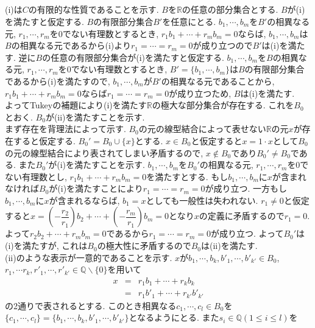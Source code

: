 \documentclass{jsarticle}
\begin{document}
\subsection{} %
(i)は$C$の有限的な性質であることを示す. $B$を$\mathbb{R}$の任意の部分集合とする. $B$が(i)を満たすと仮定する. $B$の有限部分集合$B'$を任意にとる. $b_1, \cdots, b_m$を$B'$の相異なる元, $r_1, \cdots, r_m$を0でない有理数とするとき, $r_1 b_1 + \cdots + r_m b_m = 0$ならば, $b_1, \cdots, b_m$は$B$の相異なる元であるから(i)より$r_1 = \cdots = r_m = 0$が成り立つので$B'$は(i)を満たす. 逆に$B$の任意の有限部分集合が(i)を満たすと仮定する. $b_1, \cdots, b_m$を$B$の相異なる元, $r_1, \cdots, r_m$を0でない有理数とするとき, $B' = \{b_1, \cdots, b_m\}$は$B$の有限部分集合であるから(i)を満たすので, $b_1, \cdots, b_m$が$B'$の相異なる元であることから, $r_1 b_1 + \cdots + r_m b_m = 0$ならば$r_1 = \cdots = r_m = 0$が成り立つため, $B$は(i)を満たす.\\
よってTukeyの補題により(i)を満たす$\mathbb{R}$の極大な部分集合が存在する. これを$B_0$とおく. $B_0$が(ii)を満たすことを示す.\\
まず存在を背理法によって示す. $B_0$の元の線型結合によって表せない$\mathbb{R}$の元$x$が存在すると仮定する. $B_0' = B_0 \cup \{x\}$とする. $x \in B_0$と仮定すると$x = 1 \cdot x$として$B_0$の元の線型結合により表されてしまい矛盾するので, $x \notin B_0$であり$B_0' \neq B_0$である. また$B_0'$が(i)を満たすことを示す. $b_1, \cdots, b_m$を$B_0'$の相異なる元, $r_1, \cdots, r_m$を0でない有理数とし, $r_1 b_1 + \cdots + r_m b_m = 0$を満たすとする. もし$b_1, \cdots, b_m$に$x$が含まれなければ$B_0$が(i)を満たすことにより$r_1 = \cdots = r_m = 0$が成り立つ. 一方もし$b_1, \cdots, b_m$に$x$が含まれるならば, $b_1 = x$としても一般性は失われない. $r_1 \neq 0$と仮定すると$x = \left(-\dfrac{r_2}{r_1}\right) b_2 + \cdots + \left(-\dfrac{r_m}{r_1}\right) b_m = 0$となり$x$の定義に矛盾するので$r_1 = 0$. よって$r_2 b_2 + \cdots + r_m b_m = 0$であるから$r_1 = \cdots = r_m = 0$が成り立つ. よって$B_0'$は(i)を満たすが, これは$B_0$の極大性に矛盾するので$B_0$は(ii)を満たす.\\
(ii)のような表示が一意的であることを示す. $x$が$b_1, \cdots, b_k, b'_1, \cdots, b'_{k'} \in B_0$, $r_1, \cdots r_k, r'_1, \cdots, r'_{k'} \in \mathbb{Q} \backslash \{0\}$を用いて
\begin{eqnarray*}
	x
	&=& r_1 b_1 + \cdots + r_k b_k\\
	&=& r_1 b'_1 + \cdots + r_{k'} b'_{k'}
\end{eqnarray*}
の2通りで表されるとする. このとき相異なる$c_1, \cdots, c_l \in B_0$を$\{c_1, \cdots, c_l\} = \{b_1, \cdots, b_k, b'_1, \cdots, b'_{k'}\}$となるようにとる. また$s_i \in \mathbb{Q} (1 \le i \le l)$を
\end{document}
